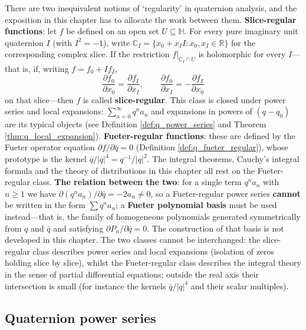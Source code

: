 \begin{remark}\label{rem:q_slice_vs_fueter}
There are two inequivalent notions of `regularity' in quaternion analysis, and the exposition in this chapter has to allocate the work between them.
\textbf{Slice-regular functions}: let $f$ be defined on an open set $U\subseteq\mathbb{H}$. For every pure imaginary unit quaternion $I$ (with $I^2=-1$), write $\mathbb{C}_I=\{x_0+x_II:x_0,x_I\in\mathbb{R}\}$ for the corresponding complex slice. If the restriction $f|_{\mathbb{C}_I\cap U}$ is holomorphic for every $I$---that is, if, writing $f=f_0+If_I$,
\[
\frac{\partial f_0}{\partial x_0}=\frac{\partial f_I}{\partial x_I},\qquad
\frac{\partial f_0}{\partial x_I}=-\frac{\partial f_I}{\partial x_0}
\]
on that slice---then $f$ is called \textbf{slice-regular}. This class is closed under power series and local expansions: $\sum_{n=0}^\infty q^n a_n$ and expansions in powers of $(q-q_0)$ are its typical objects (see Definition \ref{def:q_power_series} and Theorem \ref{thm:q_local_expansion}).
\textbf{Fueter-regular functions}: these are defined by the Fueter operator equation $\partial f/\partial\bar q=0$ (Definition \ref{def:q_fueter_regular}), whose prototype is the kernel $\bar q/|q|^4=q^{-1}/|q|^2$. The integral theorems, Cauchy's integral formula and the theory of distributions in this chapter all rest on the Fueter-regular class.
\textbf{The relation between the two}: for a single term $q^n a_n$ with $n\ge 1$ we have $\partial(q^n a_n)/\partial\bar q=-2a_n\neq 0$, so a Fueter-regular power series \textbf{cannot} be written in the form $\sum q^n a_n$; a \textbf{Fueter polynomial basis} must be used instead---that is, the family of homogeneous polynomials generated symmetrically from $q$ and $\bar q$ and satisfying $\partial P_n/\partial\bar q=0$. The construction of that basis is not developed in this chapter. The two classes cannot be interchanged: the slice-regular class describes power series and local expansions (isolation of zeros holding slice by slice), whilst the Fueter-regular class describes the integral theory in the sense of partial differential equations; outside the real axis their intersection is small (for instance the kernels $\bar q/|q|^4$ and their scalar multiples).
\end{remark}

\subsection{Quaternion power series}

